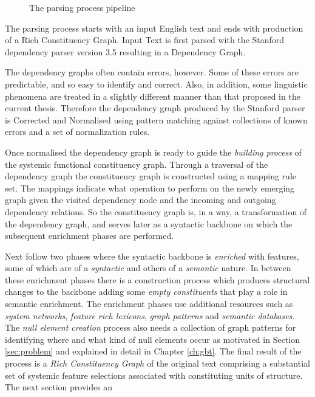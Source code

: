 \begin{figure}[!ht]
    \caption[]{The parsing process pipeline}
    \label{fig:pipeline-overview}
\end{figure}


The parsing process starts with an input English text and ends with production of a Rich Constituency Graph. Input Text is first parsed with the Stanford dependency parser version 3.5 resulting in a Dependency Graph.

The dependency graphs often contain errors, however. Some of these errors are predictable, and so easy to identify and correct. Also, in addition, some linguistic phenomena are treated in a slightly different manner than that proposed in the current thesis. Therefore the dependency graph produced by the Stanford parser is Corrected and Normalised using pattern matching against collections of known errors and a set of normalization rules.

Once normalised the dependency graph is ready to guide the \textit{building process} of the systemic functional constituency graph. Through a traversal of the dependency graph the constituency graph is constructed using a mapping rule set. The mappings indicate what operation to perform on the newly emerging graph given the visited dependency node and the incoming and outgoing dependency relations. 
So the constituency graph is, in a way, a transformation of the dependency graph, and serves later as a syntactic backbone on which the subsequent enrichment phases are performed.

Next follow two phases where the syntactic backbone is \textit{enriched} with features, some of which are of a \textit{syntactic} and others of a \textit{semantic} nature. In between these enrichment phases there is a construction process which produces structural changes to the backbone adding some \textit{empty constituents} that play a role in semantic enrichment. The enrichment phases use additional resources such as \textit{system networks}, \textit{feature rich lexicons}, \textit{graph patterns} and \textit{semantic databases}. The \textit{null element creation} process also needs a collection of graph patterns for identifying where and what kind of null elements occur as motivated in Section \ref{sec:problem} and explained in detail in Chapter \ref{ch:gbt}. The final result of the process is a \textit{Rich Constituency Graph} of the original text comprising a substantial set of systemic feature selections associated with constituting units of structure. The next section provides an  

